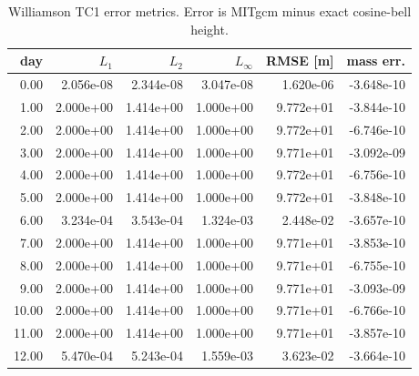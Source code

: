 \begin{table}[htbp]
\centering
{}
\begin{tabular}{rrrrrr}
\toprule
\rowcolor{gray!25}
day & $L_1$ & $L_2$ & $L_\infty$ & RMSE [m] & mass err. \\ 
\midrule
0.00 & 2.056e-08 & 2.344e-08 & 3.047e-08 & 1.620e-06 & -3.648e-10 \\ 
1.00 & 2.000e+00 & 1.414e+00 & 1.000e+00 & 9.772e+01 & -3.844e-10 \\ 
2.00 & 2.000e+00 & 1.414e+00 & 1.000e+00 & 9.772e+01 & -6.746e-10 \\ 
3.00 & 2.000e+00 & 1.414e+00 & 1.000e+00 & 9.771e+01 & -3.092e-09 \\ 
4.00 & 2.000e+00 & 1.414e+00 & 1.000e+00 & 9.772e+01 & -6.756e-10 \\ 
5.00 & 2.000e+00 & 1.414e+00 & 1.000e+00 & 9.772e+01 & -3.848e-10 \\ 
6.00 & 3.234e-04 & 3.543e-04 & 1.324e-03 & 2.448e-02 & -3.657e-10 \\ 
7.00 & 2.000e+00 & 1.414e+00 & 1.000e+00 & 9.771e+01 & -3.853e-10 \\ 
8.00 & 2.000e+00 & 1.414e+00 & 1.000e+00 & 9.771e+01 & -6.755e-10 \\ 
9.00 & 2.000e+00 & 1.414e+00 & 1.000e+00 & 9.771e+01 & -3.093e-09 \\ 
10.00 & 2.000e+00 & 1.414e+00 & 1.000e+00 & 9.771e+01 & -6.766e-10 \\ 
11.00 & 2.000e+00 & 1.414e+00 & 1.000e+00 & 9.771e+01 & -3.857e-10 \\ 
12.00 & 5.470e-04 & 5.243e-04 & 1.559e-03 & 3.623e-02 & -3.664e-10 \\ 
\bottomrule
\end{tabular}
\caption{Williamson TC1 error metrics. Error is MITgcm minus exact cosine-bell height.}
\end{table}
